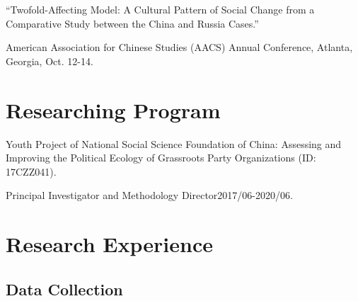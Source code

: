 \documentclass[10.5pt,]{article}
\providecommand{\tightlist}{%
	\setlength{\itemsep}{0pt}\setlength{\parskip}{0pt}}
\renewenvironment{itemize}{
	\begin{list}{}{
			\setlength{\leftmargin}{1.5em}
		}
	}{
	\end{list}
}
\begin{document}
\begin{itemize}
  \begin{itemize}
  \tightlist
  \item
    ``Twofold-Affecting Model: A Cultural Pattern of Social Change from
    a Comparative Study between the China and Russia Cases.''

    \begin{itemize}
    \tightlist
    \item
      \footnotesize American Association for Chinese Studies (AACS)
      Annual Conference, Atlanta, Georgia, Oct. 12-14.
    \end{itemize}
  \end{itemize}
\end{itemize}

\section{Researching Program}\label{researching-program}

\begin{itemize}
\tightlist
\item
  Youth Project of National Social Science Foundation of China:
  Assessing and Improving the Political Ecology of Grassroots Party
  Organizations (ID: 17CZZ041).

  \begin{itemize}
  \tightlist
  \item
    Principal Investigator and Methodology
    Director\hfill 2017/06-2020/06.
  \end{itemize}
\end{itemize}

\section{Research Experience}\label{research-experience}

\subsection{Data Collection}\label{data-collection}
\end{document}
